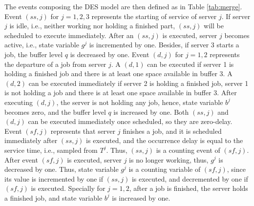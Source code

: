 \documentclass[]{interact}
\theoremstyle{plain}%
\theoremstyle{definition}
\theoremstyle{remark}
\begin{document}
The events composing the DES model are then defined as in Table \ref{tab:merge}. Event ${(ss,j)}$ for $j=1,2,3$ represents the starting of service of server $j$. If server $j$ is idle, i.e., neither working nor holding a finished part, ${(ss,j)}$ will be scheduled to execute immediately. After an ${(ss,j)}$ is executed, server $j$ becomes active, i.e., state variable $g^j$ is incremented by one. Besides, if server 3 starts a job, the buffer level $q$ is decreased by one. Event ${(d,j)}$ for $j=1,2$ represents the departure of a job from server $j$. A ${(d,1)}$ can be executed if server 1 is holding a finished job and there is at least one space available in buffer 3. A ${(d,2)}$ can be executed immediately if server 2 is holding a finished job, server 1 is not holding a job and there is at least one space available in buffer 3. After executing ${(d,j)}$, the server is not holding any job, hence, state variable $b^{j}$ becomes zero, and the buffer level $q$ is increased by one. Both ${(ss,j)}$ and ${(d,j)}$ can be executed immediately once scheduled, so they are zero-delay. Event ${(sf,j)}$ represents that server $j$ finishes a job, and it is scheduled immediately after ${(ss,j)}$ is executed, and the occurrence delay is equal to the service time, i.e., sampled from $T^{j}$. Thus, ${(ss,j)}$ is a counting event of ${(sf,j)}$. After event ${(sf,j)}$ is executed, server $j$ is no longer working, thus, $g^j$ is decreased by one. Thus, state variable $g^j$ is a counting variable of ${(sf,j)}$, since its value is incremented by one if ${(ss,j)}$ is executed, and decremented by one if  ${(sf,j)}$ is executed. Specially for $j=1,2$, after a job is finished, the server holds a finished job, and state variable $b^j$ is increased by one. %
\end{document}
